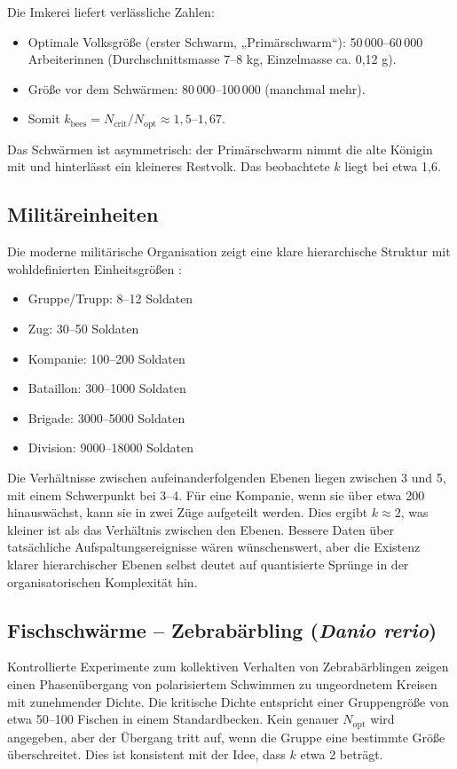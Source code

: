 \documentclass[12pt]{article}
\theoremstyle{remark}
\begin{document}
	Die Imkerei liefert verlässliche Zahlen:
	\begin{itemize}
		\item Optimale Volksgröße (erster Schwarm, „Primärschwarm“): 50\,000–60\,000 Arbeiterinnen (Durchschnittsmasse 7–8 kg, Einzelmasse ca. 0,12 g). \cite{Seeley2010, Winston1987}
		\item Größe vor dem Schwärmen: 80\,000–100\,000 (manchmal mehr). \cite{bees}
		\item Somit $k_{\text{bees}} = N_{\text{crit}}/N_{\text{opt}} \approx 1,5$–$1,67$.
	\end{itemize}
	Das Schwärmen ist asymmetrisch: der Primärschwarm nimmt die alte Königin mit und hinterlässt ein kleineres Restvolk. Das beobachtete $k$ liegt bei etwa 1,6.
	
	\subsection{Militäreinheiten}
	\label{subsec:military}
	
	Die moderne militärische Organisation zeigt eine klare hierarchische Struktur mit wohldefinierten Einheitsgrößen \cite{FM3-90.5}:
	\begin{itemize}
		\item Gruppe/Trupp: 8–12 Soldaten
		\item Zug: 30–50 Soldaten
		\item Kompanie: 100–200 Soldaten
		\item Bataillon: 300–1000 Soldaten
		\item Brigade: 3000–5000 Soldaten
		\item Division: 9000–18000 Soldaten
	\end{itemize}
	Die Verhältnisse zwischen aufeinanderfolgenden Ebenen liegen zwischen 3 und 5, mit einem Schwerpunkt bei 3–4. Für eine Kompanie, wenn sie über etwa 200 hinauswächst, kann sie in zwei Züge aufgeteilt werden. Dies ergibt $k \approx 2$, was kleiner ist als das Verhältnis zwischen den Ebenen. Bessere Daten über tatsächliche Aufspaltungsereignisse wären wünschenswert, aber die Existenz klarer hierarchischer Ebenen selbst deutet auf quantisierte Sprünge in der organisatorischen Komplexität hin.
	
	\subsection{Fischschwärme – Zebrabärbling (\textit{Danio rerio})}
	\label{subsec:fish}
	
	Kontrollierte Experimente zum kollektiven Verhalten von Zebrabärblingen \cite{Tunstrom2013} zeigen einen Phasenübergang von polarisiertem Schwimmen zu ungeordnetem Kreisen mit zunehmender Dichte. Die kritische Dichte entspricht einer Gruppengröße von etwa 50–100 Fischen in einem Standardbecken. Kein genauer $N_{\text{opt}}$ wird angegeben, aber der Übergang tritt auf, wenn die Gruppe eine bestimmte Größe überschreitet. Dies ist konsistent mit der Idee, dass $k$ etwa 2 beträgt.
	
\end{document}
